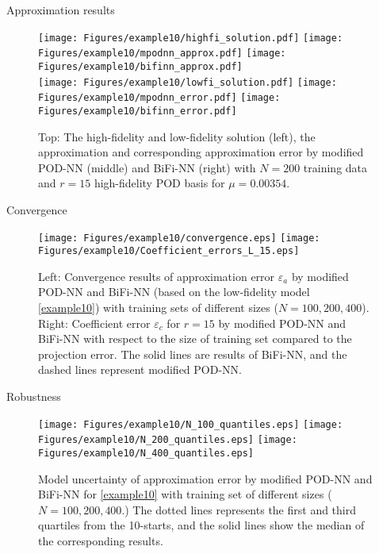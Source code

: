 \documentclass[10pt]{beamer}
\begin{document}
\begin{frame}{Approximation results}
\begin{figure}[htbp]
    \centering
    \vbox{
    \texttt{[image: Figures/example10/highfi\_solution.pdf]}
    \texttt{[image: Figures/example10/mpodnn\_approx.pdf]}
    \texttt{[image: Figures/example10/bifinn\_approx.pdf]}
    \\
    \texttt{[image: Figures/example10/lowfi\_solution.pdf]}
    \texttt{[image: Figures/example10/mpodnn\_error.pdf]}
    \texttt{[image: Figures/example10/bifinn\_error.pdf]}
    }
    \caption{Top: The high-fidelity and low-fidelity solution (left), the approximation and corresponding approximation error by modified POD-NN (middle) and BiFi-NN (right) with $N=200$ training data and $r = 15$ high-fidelity POD basis for $\mu = 0.00354$.}
    \label{example10-comparison-snapshot}
\end{figure}
\end{frame}

\begin{frame}{Convergence}
\begin{figure}[htbp]
\centering
\vbox{
\texttt{[image: Figures/example10/convergence.eps]}
\texttt{[image: Figures/example10/Coefficient\_errors\_L\_15.eps]}
}
\caption{Left: Convergence results of approximation error $\varepsilon_a$ by modified POD-NN and BiFi-NN (based on the low-fidelity model \eqref{example10}) with training sets of different sizes ($N=100,200,400$). Right: Coefficient error $\varepsilon_c$ for $r = 15$ by modified POD-NN and BiFi-NN with respect to the size of training set compared to the projection error. The solid lines are results of BiFi-NN, and the dashed lines represent modified POD-NN.}
\label{example10-errors}
\end{figure}
\end{frame}

\begin{frame}{Robustness}
\begin{figure}[ht]
    \centering
    \vbox{
    \texttt{[image: Figures/example10/N\_100\_quantiles.eps]}
    \texttt{[image: Figures/example10/N\_200\_quantiles.eps]}
    \texttt{[image: Figures/example10/N\_400\_quantiles.eps]}
    }
    \caption{Model uncertainty of approximation error by modified POD-NN and BiFi-NN for \eqref{example10} with training set of different sizes ($N = 100, 200, 400$.) The dotted lines represents the first and third quartiles from the 10-starts, and the solid lines show the median of the corresponding results.}
    \label{example10-quantiles}
\end{figure}
\end{frame}
\end{document}
